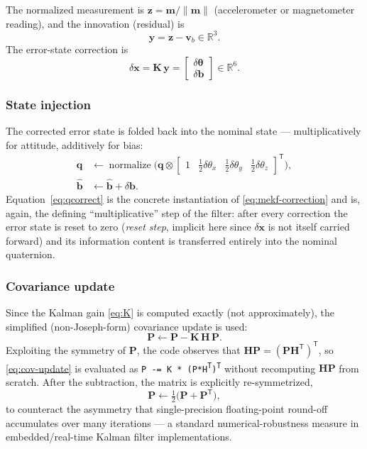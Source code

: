 \documentclass[11pt]{article}
\newcommand{\vect}[1]{\bm{#1}}
\newcommand{\mat}[1]{\bm{#1}}
\newcommand{\R}{\mathbb{R}}
\newcommand{\quat}{\vect{q}}
\newcommand{\transpose}{^{\mathsf{T}}}
\begin{document}
The normalized measurement is $\vect z = \vect m/\lVert\vect m\rVert$ (accelerometer or magnetometer reading), and the innovation (residual) is
\begin{equation}
\vect y = \vect z - \vect v_b \in \R^3 .
\end{equation}
The error-state correction is
\begin{equation}
\delta\vect x = \mat K\, \vect y = \begin{bmatrix}\delta\vect\theta \\ \delta\vect b\end{bmatrix} \in \R^6 .
\label{eq:dx}
\end{equation}

\subsubsection{State injection}

The corrected error state is folded back into the nominal state --- multiplicatively for attitude, additively for bias:
\begin{align}
\quat &\leftarrow \operatorname{normalize}\Big(\quat \otimes \begin{bmatrix}1 & \tfrac12\delta\theta_x & \tfrac12\delta\theta_y & \tfrac12\delta\theta_z\end{bmatrix}\transpose\Big), \label{eq:qcorrect}\\
\hat{\vect b} &\leftarrow \hat{\vect b} + \delta\vect b. \label{eq:bcorrect}
\end{align}
Equation~\eqref{eq:qcorrect} is the concrete instantiation of \eqref{eq:mekf-correction} and is, again, the defining ``multiplicative'' step of the filter: after every correction the error state is reset to zero (\emph{reset step}, implicit here since $\delta\vect x$ is not itself carried forward) and its information content is transferred entirely into the nominal quaternion.

\subsubsection{Covariance update}

Since the Kalman gain \eqref{eq:K} is computed exactly (not approximately), the simplified (non-Joseph-form) covariance update is used:
\begin{equation}
\mat P \leftarrow \mat P - \mat K\, \mat H\, \mat P .
\label{eq:cov-update}
\end{equation}
Exploiting the symmetry of $\mat P$, the code observes that $\mat H \mat P = (\mat P \mat H\transpose)\transpose$, so \eqref{eq:cov-update} is evaluated as \texttt{P -= K * (P*H\textsuperscript{T})\textsuperscript{T}} without recomputing $\mat H\mat P$ from scratch. After the subtraction, the matrix is explicitly re-symmetrized,
\begin{equation}
\mat P \leftarrow \tfrac12\big(\mat P + \mat P\transpose\big),
\label{eq:resymm}
\end{equation}
to counteract the asymmetry that single-precision floating-point round-off accumulates over many iterations --- a standard numerical-robustness measure in embedded/real-time Kalman filter implementations.
\end{document}
